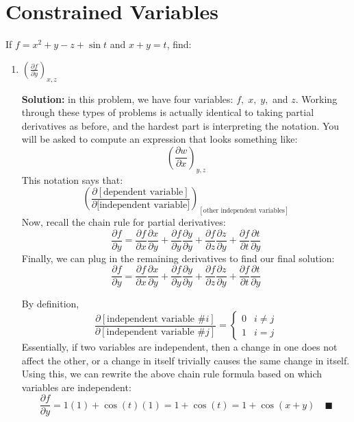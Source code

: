 \documentclass[letterpaper, 11pt]{article}
\begin{document}
\section{Constrained Variables}
If $f = x^2 + y - z + \sin t$ and $x + y = t$, find:
\begin{enumerate}[label=(\alph*)]
\item $\left( \frac{\partial f}{\partial y}\right)_{x,z}$
\par \textbf{Solution:} in this problem, we have four variables: $f,\; x,\; y,$ and $z$. Working through these types of problems is actually identical to taking partial derivatives as before, and the hardest part is interpreting the notation. You will be asked to compute an expression that looks something like:
\[ \left( \frac{\partial w}{\partial x}\right)_{y,z}\]
This notation says that:
\[ \left( \frac{ \partial [\text{dependent variable}]}{\partial \text{[independent variable]}}\right)_{[\text{other independent variables}]} \]
Now, recall the chain rule for partial derivatives:
\[ \frac{\partial f}{\partial y} = \frac{ \partial f}{\partial x}\frac{\partial x}{\partial y} + \frac{ \partial f}{\partial y}\frac{\partial y}{\partial y} +  \frac{ \partial f}{\partial z}\frac{\partial z}{\partial y}  + \frac{ \partial f}{\partial t}\frac{\partial t}{\partial y}  \]
Finally, we can plug in the remaining derivatives to find our final solution:
\[ \frac{\partial f}{\partial y} = \frac{ \partial f}{\partial x}\frac{\partial x}{\partial y} + \frac{ \partial f}{\partial y}\frac{\partial y}{\partial y} +  \frac{ \partial f}{\partial z}\frac{\partial z}{\partial y}  + \frac{ \partial f}{\partial t}\frac{\partial t}{\partial y}  \]

By definition, 
\[ \frac{ \partial [\text{independent variable \# $i$}]}{ \partial [\text{independent variable \# $j$}]} = \begin{cases} 0 & i \neq j \\ 1 & i = j \end{cases} \]
Essentially, if two variables are independent, then a change in one does not affect the other, or a change in itself trivially causes the same change in itself. Using this, we can rewrite the above chain rule formula based on which variables are independent:
\[ \frac{\partial f}{\partial y} = 1(1) +  \cos(t) (1) =  1 + \cos (t) = 1  + \cos(x + y) \quad\blacksquare\]


\end{enumerate}
\end{document}

